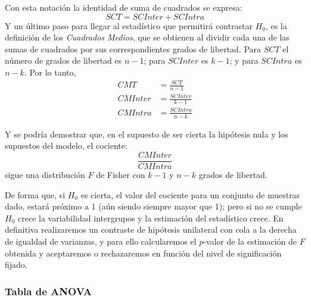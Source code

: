 Con esta notación la identidad de suma de cuadrados se expresa:
\[
SCT=SCInter+SCIntra
\]
Y un último paso para llegar al estadístico que permitirá contrastar $H_0$, es la definición de los \emph{Cuadrados
Medios}, que se obtienen al dividir cada una de las sumas de cuadrados por sus correspondientes grados de libertad.
Para $SCT$ el número de grados de libertad es $n-1$; para $SCInter$ es $k-1$; y para $SCIntra$ es $n-k$.
Por lo tanto,
\begin{align*}
CMT &= \frac{{SCT}}{{n - 1}}\\
CMInter &= \frac{{SCInter}}{{k - 1}}\\
CMIntra &= \frac{{SCIntra}}{{n -k}}
\end{align*}

Y se podría demostrar que, en el supuesto de ser cierta la hipótesis nula y los supuestos del modelo, el cociente:
\[
\frac{{CMInter}}{{CMIntra}}
\] 
sigue una distribución $F$ de Fisher con $k-1$ y $n-k$ grados de libertad.

De forma que, si $H_0$ es cierta, el valor del cociente para un conjunto de muestras dado, estará próximo a 1 (aún
siendo siempre mayor que 1); pero si no se cumple $H_0$ crece la variabilidad intergrupos y la estimación del
estadístico crece.
En definitiva realizaremos un contraste de hipótesis unilateral con cola a la derecha de igualdad de varianzas, y para
ello calcularemos el $p$-valor de la estimación de $F$ obtenida y aceptaremos o rechazaremos en función del nivel de
significación fijado.

\subsubsection{Tabla de ANOVA}

